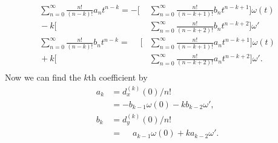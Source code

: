 \documentclass{report}
\begin{document}
\begin{equation} \label{eq:diffk}
    \begin{aligned}
    \sum_{n=0}^\infty \frac{n!}{(n-k)!} a_n t^{n-k} =
        -\Bigg[&\sum_{n=0}^\infty \frac{n!}{(n-k+1)!} b_n t^{n-k+1} \Bigg]
             \omega(t)
                \\
                {}-k\Bigg[&\sum_{n=0}^\infty \frac{n!}{(n-k+2)!} b_n t^{n-k+2} \Bigg]
                \omega'\\
    \sum_{n=0}^\infty \frac{n!}{(n-k)!} b_n t^{n-k} =
        \phantom{-}\Bigg[&\sum_{n=0}^\infty \frac{n!}{(n-k+1)!} a_n t^{n-k+1} \Bigg]
             \omega(t)
                \\
                {}+ k\Bigg[&\sum_{n=0}^\infty \frac{n!}{(n-k+2)!} a_n t^{n-k+2} \Bigg]
                \omega'.\\
    \end{aligned}
\end{equation}
Now we can find the $k$th coefficient by
\begin{equation}
    \begin{aligned}
        a_k &= d_x^{(k)}(0)/n! \\
            &= -b_{k-1} \omega(0) - k b_{k-2} \omega',\\
        b_k &= d_y^{(k)}(0)/n! \\
            &= \phantom{-}a_{k-1} \omega(0) + k a_{k-2} \omega'.
    \end{aligned}
\end{equation}
\end{document}
